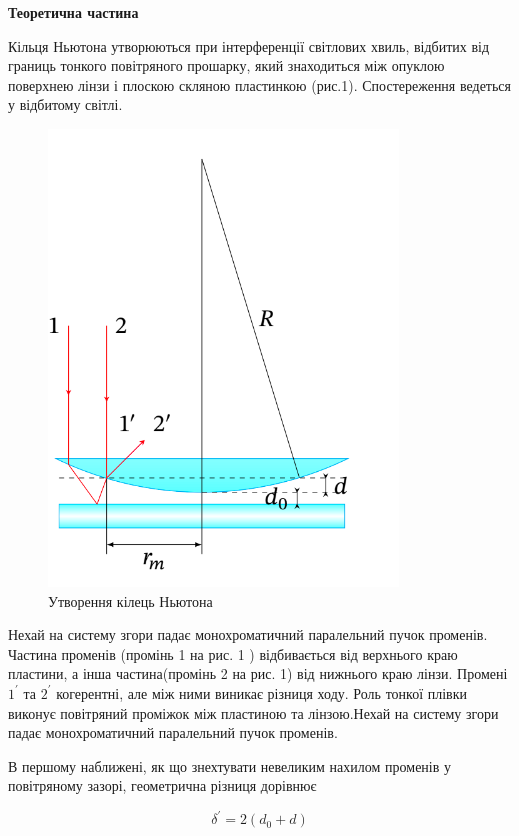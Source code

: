 \begin{center}
    \Large{\textbf{Теоретична частина}}    
\end{center}

\vspace{1mm}

Кільця Ньютона утворюються при інтерференції світлових хвиль, відбитих
від границь тонкого повітряного прошарку, який знаходиться між опуклою
поверхнею лінзи і плоскою скляною пластинкою (рис.1). Спостереження
ведеться у відбитому світлі.


\begin{figure}    
    \centering
    \includegraphics[width=.4\textwidth]{assets/illustation.png}
    \caption{Утворення кілець Ньютона}
    \vspace{0.5cm}
\end{figure}


Нехай на систему згори падає монохроматичний 
паралельний пучок променів. Частина
променів (промінь 1 на рис. 1 ) відбивається 
від верхнього краю пластини, а інша
частина(промінь 2 на рис. 1) від нижнього краю лінзи.
Промені $1^{'}$ та $2^{'}$ когерентні, але між ними
виникає різниця ходу. Роль тонкої плівки
виконує повітряний проміжок між пластиною
та лінзою.Нехай на систему згори падає 
монохроматичний паралельний пучок променів.

В першому наближені, як що знехтувати невеликим нахилом
променів у повітряному зазорі, геометрична різниця дорівнює

\begin{equation} \label{eq:1}
    \delta^{'} = 2(d_0 + d)
\end{equation}

